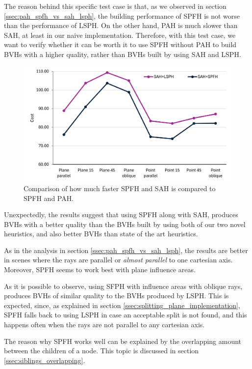 \documentclass{PoliMi_MasterThesis}
\begin{document}
The reason behind this specific test case is that, as we observed in section \ref{ssec:pah_spfh_vs_sah_lsph}, the building performance of SPFH is not worse than the performance of LSPH. On the other hand, PAH is much slower than SAH, at least in our naive implementation. Therefore, with this test case, we want to verify whether it can be worth it to use SPFH without PAH to build BVHs with a higher quality, rather than BVHs built by using SAH and LSPH.

\begin{figure}[H]
	\centering
	\includegraphics[width=\textwidth]{Images/spfh_isolation.png}
	\caption{Comparison of how much faster SPFH and SAH is compared to SPFH and PAH.}
	\label{fig:spfh_isolation}
\end{figure}

Unexpectedly, the results suggest that using SPFH along with SAH, produces BVHs with a better quality than the BVHs built by using both of our two novel heuristics, and also better BVHs than state of the art heuristics.

As in the analysis in section \ref{ssec:pah_spfh_vs_sah_lsph}, the results are better in scenes where the rays are parallel or \textit{almost parallel} to one cartesian axis. Moreover, SPFH seems to work best with plane influence areas.

As it is possible to observe, using SFPH with influence areas with oblique rays, produces BVHs of similar quality to the BVHs produced by LSPH. This is expected, since, as explained in section \ref{ssec:splitting_plane_implementation}, SPFH falls back to using LSPH in case an acceptable split is not found, and this happens often when the rays are not parallel to any cartesian axis.

The reason why SPFH works well can be explained by the overlapping amount between the children of a node. This topic is discussed in section \ref{ssec:siblings_overlapping}.
\end{document}
